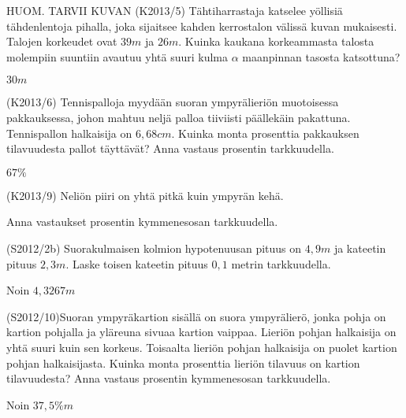\begin{tehtava}
HUOM. TARVII KUVAN 
(K2013/5) Tähtiharrastaja katselee yöllisiä tähdenlentoja pihalla, joka sijaitsee kahden kerrostalon välissä kuvan mukaisesti. Talojen korkeudet ovat $39 m$ ja $26 m$. Kuinka kaukana korkeammasta talosta molempiin suuntiin avautuu yhtä suuri kulma $\alpha$ maanpinnan tasosta katsottuna? 
  \begin{vastaus}
  $30 m$
  \end{vastaus}
\end{tehtava}

\begin{tehtava}
(K2013/6) Tennispalloja myydään suoran ympyrälieriön muotoisessa pakkauksessa, johon mahtuu neljä palloa tiiviisti päällekäin pakattuna. Tennispallon halkaisija on $6,68 cm$. Kuinka monta prosenttia pakkauksen tilavuudesta pallot täyttävät? Anna vastaus prosentin tarkkuudella.
  \begin{vastaus}
  $67\%$
  \end{vastaus}
\end{tehtava}

\begin{tehtava}(K2013/9) Neliön piiri on yhtä pitkä kuin ympyrän kehä.
\begin{alakohdat}
Anna vastaukset prosentin kymmenesosan tarkkuudella.
 \end{alakohdat}
    \begin{vastaus}
    \begin{alakohdat}
   \end{alakohdat}
 \end{vastaus}
\end{tehtava}

\begin{tehtava}
(S2012/2b) Suorakulmaisen kolmion hypotenuusan pituus on $4,9 m$ ja kateetin pituus $2,3 m$. Laske toisen kateetin pituus $0,1$ metrin tarkkuudella.
  \begin{vastaus}
  Noin $4,3267 m$
  \end{vastaus}
\end{tehtava}

\begin{tehtava}
(S2012/10)Suoran ympyräkartion sisällä on suora ympyrälierö, jonka pohja on kartion pohjalla ja yläreuna sivuaa kartion vaippaa. Lieriön pohjan halkaisija on yhtä suuri kuin sen korkeus. Toisaalta lieriön pohjan halkaisija on puolet kartion pohjan halkaisijasta. Kuinka monta prosenttia lieriön tilavuus on kartion tilavuudesta? Anna vastaus prosentin kymmenesosan tarkkuudella.
  \begin{vastaus}
  Noin $37,5\% m$
  \end{vastaus}
\end{tehtava}

